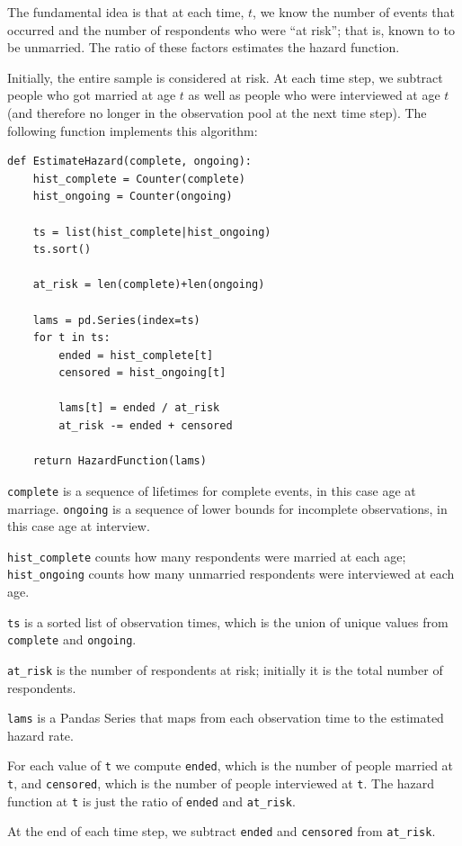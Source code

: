 \documentclass[journal]{IEEEtran}
\begin{document}
The fundamental idea is that at each time, $t$, we know the number
of events that occurred and the number of respondents who were
``at risk''; that is, known to to be unmarried.  The ratio of these
factors estimates the hazard function.

Initially, the entire sample is considered at risk.  At each
time step, we subtract people who got married at age $t$ as well
as people who were interviewed at age $t$ (and therefore no
longer in the observation pool at the next time step).  The
following function implements this algorithm:

\begin{verbatim}
def EstimateHazard(complete, ongoing):
    hist_complete = Counter(complete)
    hist_ongoing = Counter(ongoing)

    ts = list(hist_complete|hist_ongoing)
    ts.sort()

    at_risk = len(complete)+len(ongoing)

    lams = pd.Series(index=ts)
    for t in ts:
        ended = hist_complete[t]
        censored = hist_ongoing[t]

        lams[t] = ended / at_risk
        at_risk -= ended + censored

    return HazardFunction(lams)
\end{verbatim}

{\tt complete} is a sequence of lifetimes for complete events,
in this case age at marriage.  {\tt ongoing} is a sequence of
lower bounds for incomplete observations, in this case age at
interview.

\verb"hist_complete" counts how many respondents were married
at each age; \verb"hist_ongoing" counts how many unmarried
respondents were interviewed at each age.

{\tt ts} is a sorted list of observation times, which is the
union of unique values from {\tt complete} and {\tt ongoing}.

\verb"at_risk" is the number of respondents at risk; initially
it is the total number of respondents.

{\tt lams} is a Pandas Series that maps from each observation
time to the estimated hazard rate.  

For each value of {\tt t} we compute {\tt ended}, which is
the number of people married at {\tt t}, and {\tt censored}, which
is the number of people interviewed at {\tt t}.  The hazard
function at {\tt t} is just the ratio of {\tt ended} and
\verb"at_risk".

At the end of each time step, we subtract {\tt ended} and
{\tt censored} from \verb"at_risk".
\end{document}
